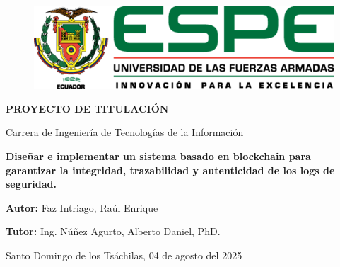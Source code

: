 \thispagestyle{plain}
\pagestyle{plain}

\begin{figure}[t]
	\centering
	\includegraphics[scale=0.8]{figuras/logo.png}
\end{figure}

\vspace{2cm}

\begin{center}
\textbf{PROYECTO DE TITULACIÓN}
\vspace{2cm}

Carrera de Ingeniería de Tecnologías de la Información
\vspace{2cm}

\textbf{Diseñar e implementar un sistema basado en blockchain para garantizar la integridad, trazabilidad y autenticidad de los logs de seguridad.}
\vspace{2cm}

\textbf{Autor: } Faz Intriago, Raúl Enrique
\vspace{2cm}

\textbf{Tutor: } Ing. Núñez Agurto, Alberto Daniel, PhD.
\vspace{4cm}
\begin{flushright}
Santo Domingo de los Tsáchilas, 04 de agosto del 2025
\end{flushright}
\end{center}